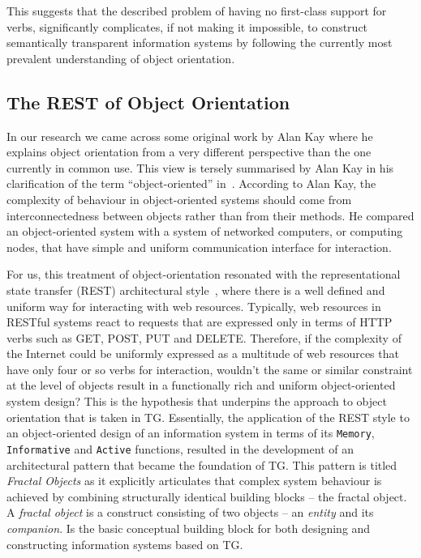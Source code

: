 \documentclass[a4paper,12pt,oneside,openright,final]{memoir} %
\begin{document}
	This suggests that the described problem of having no first-class support for verbs, significantly complicates, if not making it impossible, to construct semantically transparent information systems by following the currently most prevalent understanding of object orientation.

\subsection*{The REST of Object Orientation}	
	
	In our research we came across some original work by Alan Kay where he explains object orientation from a very different perspective than the one currently in common use.
	This view is tersely summarised by Alan Kay in his clarification of  the term ``object-oriented'' in~\cite{Kay2003}.
	According to Alan Kay, the complexity of behaviour in object-oriented systems should come from interconnectedness between objects rather than from their methods.
	He compared an object-oriented system with a system of networked computers, or computing nodes, that have simple and uniform communication interface for interaction.
	
	For us, this treatment of object-orientation resonated with the representational state transfer (REST) architectural style~\cite{Fielding2000}, where there is a well defined and uniform way for interacting with web resources.
	Typically, web resources in RESTful systems react to requests that are expressed only in terms of HTTP verbs such as GET, POST, PUT and DELETE.
	Therefore, if the complexity of the Internet could be uniformly expressed as a multitude of web resources that have only four or so verbs for interaction, wouldn't the same or similar constraint at the level of objects result in a functionally rich and uniform object-oriented system design?
	This is the hypothesis that underpins the approach to object orientation that is taken in TG.
	Essentially, the application of the REST style to an object-oriented design of an information system in terms of its \texttt{Memory}, \texttt{Informative} and \texttt{Active} functions, resulted in the development of an architectural pattern that became the foundation of TG.
	This pattern is titled \emph{Fractal Objects} as it explicitly articulates that complex system behaviour is achieved by combining structurally identical building blocks -- the fractal object.
	A \emph{fractal object} is a construct consisting of two objects -- an \emph{entity} and its \emph{companion}.
	Is the basic conceptual building block for both designing and constructing information systems based on TG.
	
\end{document}
